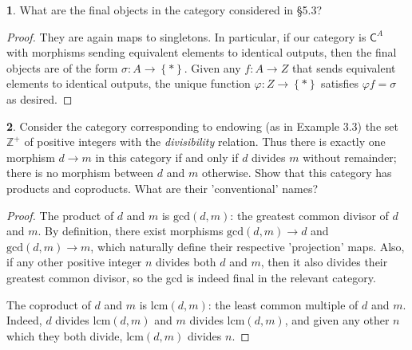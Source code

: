 \documentclass{article}
\theoremstyle{definition}
\newtheorem{ex}{}[section]
\begin{document}
\begin{ex}
	What are the final objects in the category considered in \S 5.3?
\end{ex}
\begin{proof}
	They are again maps to singletons.
	In particular, if our category is $\mathsf{C}^A$ with morphisms sending equivalent elements to identical outputs, then the final objects are of the form $\sigma : A \to \left\lbrace * \right\rbrace$.
	Given any $f: A \to Z$ that sends equivalent elements to identical outputs, the unique function $\varphi : Z \to \left\lbrace * \right\rbrace$ satisfies $\varphi f = \sigma$ as desired.
\end{proof}

\begin{ex}
	Consider the category corresponding to endowing (as in Example 3.3) the set $\mathbb{Z}^+$ of positive integers with the \textit{divisibility} relation.
	Thus there is exactly one morphism $d \to m $ in this category if and only if $d$ divides $m $ without remainder; there is no morphism between $d$ and $m $ otherwise.
	Show that this category has products and coproducts.
	What are their 'conventional' names?
\end{ex}
\begin{proof}
	The product of $d$ and $m $ is $\mathrm{gcd}(d, m )$: the greatest common divisor of $d$ and $m $.
	By definition, there exist morphisms $\mathrm{gcd}(d, m ) \to d$ and $\mathrm{gcd}(d, m ) \to m$, which naturally define their respective 'projection' maps.
	Also, if any other positive integer $n$ divides both $d$ and $m $, then it also divides their greatest common divisor, so the gcd is indeed final in the relevant category.

	The coproduct of $d$ and $m $ is $\mathrm{lcm}(d, m)$: the least common multiple of $d$ and $m $.
	Indeed, $d$ divides $\mathrm{lcm}(d, m )$ and $m $ divides $\mathrm{lcm}(d, m )$, and given any other $n$ which they both divide, $\mathrm{lcm}(d, m )$ divides $n$.
\end{proof}
\end{document}
